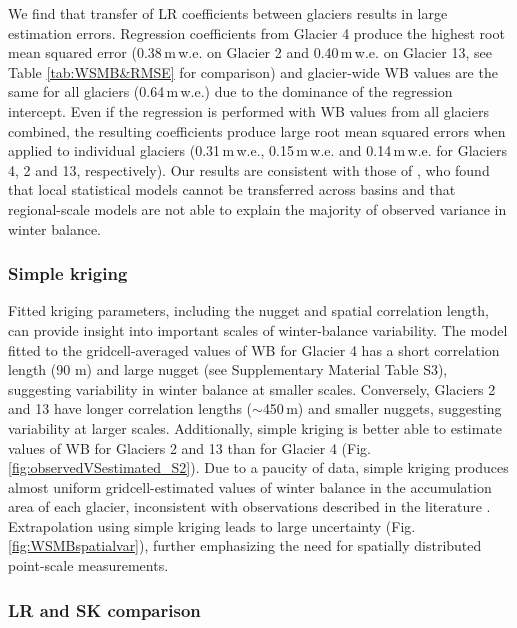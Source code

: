 \documentclass[review,oneside, letterpaper]{igs}
\begin{document}
We find that transfer of LR coefficients between glaciers results in large estimation errors. Regression coefficients from Glacier 4 produce the highest root mean squared error (0.38\,m\,w.e. on Glacier 2 and 0.40\,m\,w.e. on Glacier 13, see Table \ref{tab:WSMB&RMSE} for comparison) and glacier-wide WB values are the same for all glaciers (0.64\,m\,w.e.) due to the dominance of the regression intercept. Even if the regression is performed with WB values from all glaciers combined, the resulting coefficients produce large root mean squared errors when applied to  individual glaciers (0.31\,m\,w.e., 0.15\,m\,w.e. and 0.14\,m\,w.e. for Glaciers 4, 2 and 13, respectively). Our results are consistent with those of \cite{Grunewald2013}, who found that local statistical models cannot be transferred across basins and that regional-scale models are not able to explain the majority of observed variance in winter balance. 

\subsubsection{Simple kriging}

Fitted kriging parameters, including the nugget and spatial correlation length, can provide insight into important scales of winter-balance variability. The model fitted to the gridcell-averaged values of WB for Glacier 4 has a short correlation length (90 m) and large nugget (see Supplementary Material Table S3), suggesting variability in winter balance at smaller scales. Conversely, Glaciers 2 and 13 have longer correlation lengths ($\sim$450\,m) and smaller nuggets, suggesting variability at larger scales. 
Additionally, simple kriging is better able to estimate values of WB for Glaciers 2 and 13 than for Glacier 4 (Fig. \ref{fig:observedVSestimated_S2}). Due to a paucity of data, simple kriging produces almost uniform gridcell-estimated values of winter balance in the accumulation area of each glacier,  inconsistent with observations described in the literature \citep[e.g.][]{Machguth2006, Grabiec2011}. Extrapolation using simple kriging leads to large uncertainty (Fig. \ref{fig:WSMBspatialvar}), further emphasizing the need for spatially distributed point-scale measurements. 

\subsubsection{LR and SK comparison}
 
\end{document}
